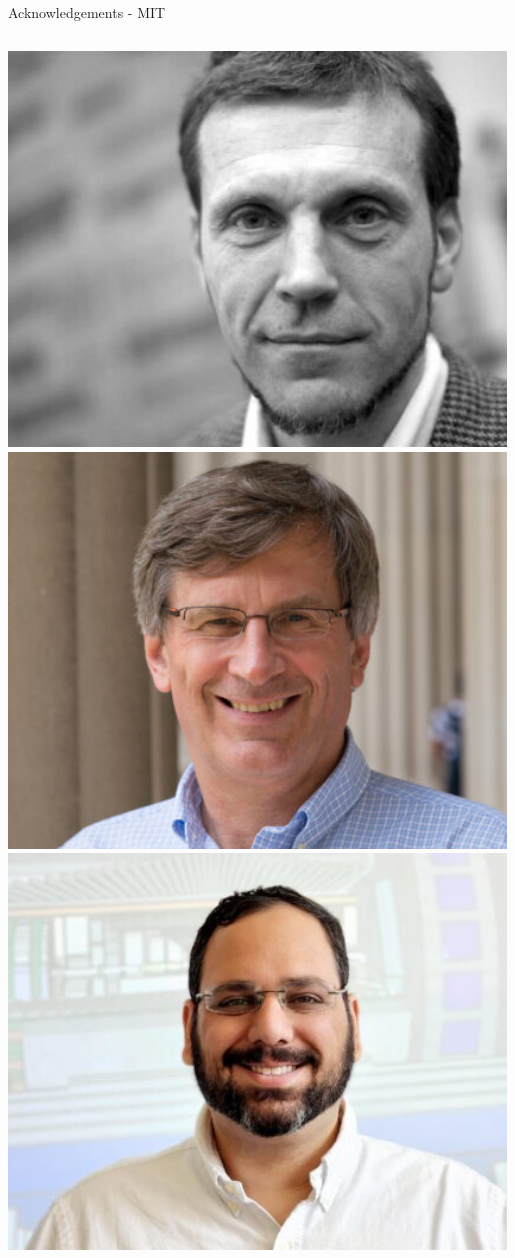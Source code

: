 \documentclass[aspectratio=169]{beamer}
\begin{document}
\begin{frame}{Acknowledgements - MIT}
\begin{columns}
            \centering
            \includegraphics[width=0.99\textwidth]{people/milnergroup/christoph.png}
            \includegraphics[width=0.99\textwidth]{people/milnergroup/bolek.png}
            \centering
            \includegraphics[width=0.99\textwidth]{people/milnergroup/orhen.png}

\end{columns}
\end{frame}
\end{document}
